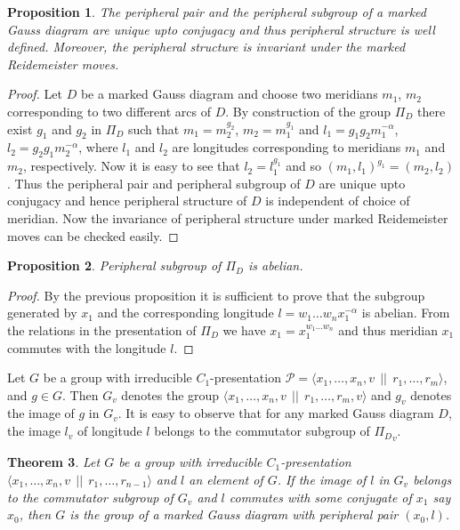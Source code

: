 \documentclass[11 pt, reqno]{amsart}
\newtheorem{theorem}{Theorem}[section]
\newtheorem{proposition}[theorem]{Proposition}
\theoremstyle{definition}
\numberwithin{equation}{subsection}
\begin{document}
\begin{proposition}
The peripheral pair and the peripheral subgroup of a marked Gauss diagram are unique upto conjugacy and thus peripheral structure is well defined. Moreover, the peripheral structure is invariant under the marked Reidemeister moves.
\end{proposition}
\begin{proof}
Let $D$ be a marked Gauss diagram and choose two meridians $m_1$, $m_2$ corresponding to two different arcs of $D$. By construction of the group $\Pi_D$ there exist $g_1$ and $g_2$ in $\Pi_D$ such that $m_1=m_2^{g_2}$, $m_2=m_1^{g_1}$ and $l_1=g_1g_2m_1^{-\alpha}$, $l_2=g_2g_1m_2^{-\alpha}$, where $l_1$ and $l_2$ are longitudes corresponding to meridians $m_1$ and $m_2$, respectively. Now it is easy to see that $l_2=l_1^{g_1}$ and so $(m_1, l_1)^{g_1}=(m_2,l_2)$. Thus the peripheral pair and peripheral subgroup of $D$ are unique upto conjugacy and hence peripheral structure of $D$ is independent of choice of meridian. Now the invariance of peripheral structure under marked Reidemeister moves can be checked easily.
\end{proof}

\begin{proposition}
Peripheral subgroup of $\Pi_D$ is abelian.
\end{proposition}
\begin{proof}
By the previous proposition it is sufficient to prove that the subgroup generated by $x_1$ and the corresponding longitude $l=w_1 \ldots w_n x_1^{-\alpha}$ is abelian. From the relations in the presentation of $\Pi_D$ we have $x_1=x_1^{w_1 \ldots w_n}$ and thus meridian $x_1$ commutes with the longitude $l$.
\end{proof}

Let $G$ be a group with irreducible $C_1$-presentation $\mathcal{P}=\langle x_1, \ldots, x_n, v~~||~~r_1, \ldots, r_m \rangle$, and $g \in G$. Then $G_v$ denotes the group $\langle x_1, \ldots, x_n, v~~||~~r_1, \ldots, r_m, v \rangle $ and $g_v$  denotes the image of $g$ in $G_v$. It is easy to observe that for any marked Gauss diagram $D$, the image $l_v$ of longitude $l$ belongs to the commutator subgroup of ${\Pi_D}_v$.

\begin{theorem}\label{sufficiency-of-longitude}
Let $G$ be a group with irreducible $C_1$-presentation $\langle x_1, \ldots, x_n, v~~||~~r_1, \ldots, r_{n-1} \rangle$ and $l$ an element of $G$. If the image of $l$ in $G_v$ belongs to the commutator subgroup of $G_v$ and $l$ commutes with some conjugate of $x_1$ say $x_0$, then $G$ is the group of a marked Gauss diagram with peripheral pair $(x_0, l)$.
\end{theorem}
\end{document}

